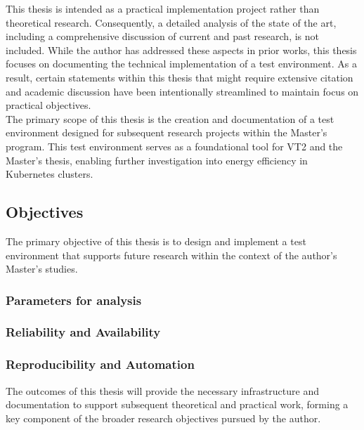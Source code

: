 This thesis is intended as a practical implementation project rather than theoretical research. Consequently, a detailed analysis of the state of the art, including a comprehensive discussion of current and past research, is not included. While the author has addressed these aspects in prior works, this thesis focuses on documenting the technical implementation of a test environment. As a result, certain statements within this thesis that might require extensive citation and academic discussion have been intentionally streamlined to maintain focus on practical objectives.\\
The primary scope of this thesis is the creation and documentation of a test environment designed for subsequent research projects within the Master's program. This test environment serves as a foundational tool for VT2 and the Master's thesis, enabling further investigation into energy efficiency in Kubernetes clusters.\\

\subsection{Objectives}

The primary objective of this thesis is to design and implement a test environment that supports future research within the context of the author's Master's studies.\\

\subsubsection{Parameters for analysis}

\subsubsection{Reliability and Availability}

\subsubsection{Reproducibility and Automation}

The outcomes of this thesis will provide the necessary infrastructure and documentation to support subsequent theoretical and practical work, forming a key component of the broader research objectives pursued by the author.
